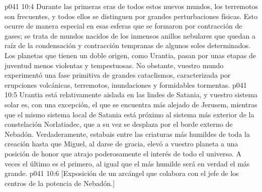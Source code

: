 \vs p041 10:4 Durante las primeras eras de todos estos nuevos mundos, los terremotos son frecuentes, y todos ellos se distinguen por grandes perturbaciones físicas. Esto ocurre de manera especial en esas esferas que se formaron por contracción de gases; se trata de mundos nacidos de los inmensos anillos nebulares que quedan a raíz de la condensación y contracción tempranas de algunos soles determinados. Los planetas que tienen un doble origen, como Urantia, pasan por unas etapas de juventud menos violentas y tempestuosas. No obstante, vuestro mundo experimentó una fase primitiva de grandes cataclismos, caracterizada por erupciones volcánicas, terremotos, inundaciones y formidables tormentas.
\vs p041 10:5 \pc Urantia está relativamente aislada en las lindes de Satania, y vuestro sistema solar es, con una excepción, el que se encuentra más alejado de Jerusem, mientras que el mismo sistema local de Satania está próximo al sistema más exterior de la constelación Norlatiadec, que a su vez se desplaza por el borde externo de Nebadón. Verdaderamente, estabais entre las criaturas más humildes de toda la creación hasta que Miguel, al darse de gracia, elevó a vuestro planeta a una posición de honor que atrajo poderosamente el interés de todo el universo. A veces el último es el primero, al igual que el más humilde será en verdad el más grande.
\vsetoff
\vs p041 10:6 [Exposición de un arcángel que colabora con el jefe de los centros de la potencia de Nebadón.]
